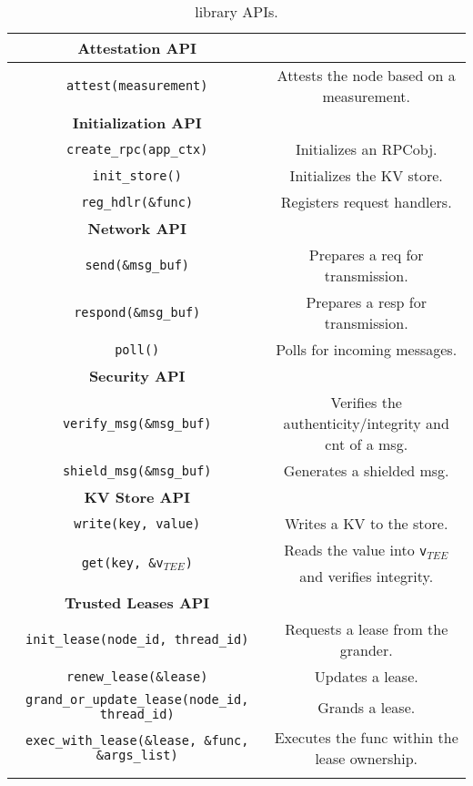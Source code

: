 \begin{table}[t]
\small

\begin{center}
\begin{tabular}{ |c|c| }
 \hline
 \bf{Attestation API} &  \\ \hline
 \multirow{1}{*}{\texttt{attest(measurement)}} & Attests the node based on  a measurement.  \\  \hline \hline
 \bf{Initialization API} &  \\ \hline
 \texttt{create\_rpc(app\_ctx)} & Initializes an RPCobj. \\
  \texttt{init\_store()} & Initializes the KV store. \\
  \texttt{reg\_hdlr(\&func)} & Registers request handlers. \\ \hline \hline
 \bf{Network API} &  \\ \hline
 \texttt{send(\&msg\_buf)} & Prepares a req for transmission. \\
 \multirow{1}{*}{\texttt{respond(\&msg\_buf)}} & Prepares a resp for transmission. \\
 \texttt{poll()} & Polls for incoming messages. \\\hline \hline
 \bf{Security API} &  \\ \hline
 \texttt{verify\_msg(\&msg\_buf)} & Verifies the authenticity/integrity and cnt of a msg. \\
 \texttt{shield\_msg(\&msg\_buf)} & Generates a shielded msg. \\ \hline \hline
 \bf{KV Store API} &  \\ \hline
 \texttt{write(key, value)} & Writes a KV to the store. \\
 \hline
 \multirow{2}{*}{\texttt{get(key, \&v$_{TEE}$)}} & Reads the value into \texttt{v$_{TEE}$} \\ & and verifies integrity. \\ \hline %
 \if 0
 \bf{Trusted Leases API} &  \\ \hline
 \texttt{init\_lease(node\_id, thread\_id)} & Requests a lease from the grander.\\ \hline
 \texttt{renew\_lease(\&lease)} & Updates a lease.\\ \hline
 \texttt{grand\_or\_update\_lease(node\_id, thread\_id)} & Grands a lease.\\ \hline
 \texttt{exec\_with\_lease(\&lease, \&func, \&args\_list)} & Executes the func within the lease ownership.\\ [1ex] \hline
 \fi
\end{tabular}
\end{center}
\caption{\projecttitle{} library APIs.} \label{tab:api}
\vspace{-6pt}
\end{table}






